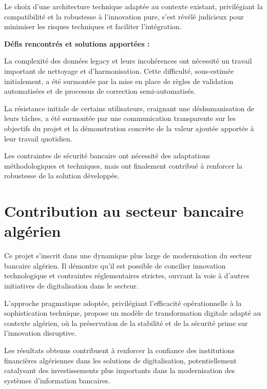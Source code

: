 \medskip

Le choix d'une architecture technique adaptée au contexte existant, privilégiant la compatibilité et la robustesse à l'innovation pure, s'est révélé judicieux pour minimiser les risques techniques et faciliter l'intégration.

\medskip

\textbf{Défis rencontrés et solutions apportées :}

La complexité des données legacy et leurs incohérences ont nécessité un travail important de nettoyage et d'harmonisation. Cette difficulté, sous-estimée initialement, a été surmontée par la mise en place de règles de validation automatisées et de processus de correction semi-automatisés.

\medskip

La résistance initiale de certains utilisateurs, craignant une déshumanisation de leurs tâches, a été surmontée par une communication transparente sur les objectifs du projet et la démonstration concrète de la valeur ajoutée apportée à leur travail quotidien.

\medskip

Les contraintes de sécurité bancaire ont nécessité des adaptations méthodologiques et techniques, mais ont finalement contribué à renforcer la robustesse de la solution développée.

\section*{Contribution au secteur bancaire algérien}

Ce projet s'inscrit dans une dynamique plus large de modernisation du secteur bancaire algérien. Il démontre qu'il est possible de concilier innovation technologique et contraintes réglementaires strictes, ouvrant la voie à d'autres initiatives de digitalisation dans le secteur.

\medskip

L'approche pragmatique adoptée, privilégiant l'efficacité opérationnelle à la sophistication technique, propose un modèle de transformation digitale adapté au contexte algérien, où la préservation de la stabilité et de la sécurité prime sur l'innovation disruptive.

\medskip

Les résultats obtenus contribuent à renforcer la confiance des institutions financières algériennes dans les solutions de digitalisation, potentiellement catalysant des investissements plus importants dans la modernisation des systèmes d'information bancaires.

